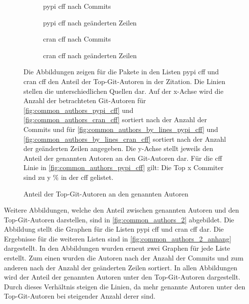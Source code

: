 \begin{figure}
    \begin{subfigure}{.5\textwidth}
        \centering
        
        \caption{\gls{pypi} \gls{cff} nach Commits}
        \label{fig:common_authors_pypi_cff}
    \end{subfigure}%
    \begin{subfigure}{.5\textwidth}
        \centering
        
        \caption{\gls{pypi} \gls{cff} nach geänderten Zeilen}
        \label{fig:common_authors_by_lines_pypi_cff}
    \end{subfigure}
    \begin{subfigure}{.5\textwidth}
        \centering
        
        \caption{\gls{cran} \gls{cff} nach Commits}
        \label{fig:common_authors_cran_cff}
    \end{subfigure}%
    \begin{subfigure}{.5\textwidth}
        \centering
        
        \caption{\gls{cran} \gls{cff} nach geänderten Zeilen}
        \label{fig:common_authors_by_lines_cran_cff}
    \end{subfigure}
    \caption{Anteil der Top-Git-Autoren an den genannten Autoren}
    \label{fig:common_authors}
    \small
    Die Abbildungen zeigen für die Pakete in den Listen \gls{pypi} \gls{cff} und \gls{cran} \gls{cff} den Anteil der Top-Git-Autoren in der Zitation. Die Linien stellen die unterschiedlichen Quellen dar. Auf der x-Achse wird die Anzahl der betrachteten Git-Autoren für \autoref{fig:common_authors_pypi_cff} und \autoref{fig:common_authors_cran_cff} sortiert nach der Anzahl der Commits und für \autoref{fig:common_authors_by_lines_pypi_cff} und \autoref{fig:common_authors_by_lines_cran_cff} sortiert nach der Anzahl der geänderten Zeilen angegeben. Die y-Achse stellt jeweils den Anteil der genannten Autoren an den Git-Autoren dar. Für die \gls{cff} Linie in \autoref{fig:common_authors_pypi_cff} gilt: Die Top x Commiter sind zu y \% in der \gls{cff} gelistet.
\end{figure}

Weitere Abbildungen, welche den Anteil zwischen genannten Autoren und den Top-Git-Autoren darstellen, sind in \autoref{fig:common_authors_2} abgebildet.
Die Abbildung stellt die Graphen für die Listen \gls{pypi} \gls{cff} und \gls{cran} \gls{cff} dar.
Die Ergebnisse für die weiteren Listen sind in \autoref{fig:common_authors_2_anhang} dargestellt.
In den Abbildungen wurden erneut zwei Graphen für jede Liste erstellt.
Zum einen wurden die Autoren nach der Anzahl der Commits und zum anderen nach der Anzahl der geänderten Zeilen sortiert.
In allen Abbildungen wird der Anteil der genannten Autoren unter den Top-Git-Autoren dargestellt.
Durch dieses Verhältnis steigen die Linien, da mehr genannte Autoren unter den Top-Git-Autoren bei steigender Anzahl derer sind.


